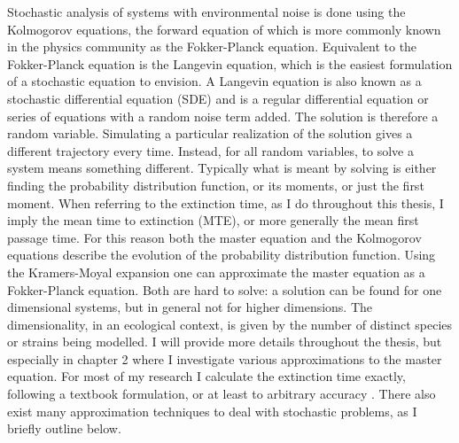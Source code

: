 \iffalse
Stochastic analysis of systems with environmental noise is done using the Kolmogorov equations, the forward equation of which is more commonly known in the physics community as the Fokker-Planck equation. 
Equivalent to the Fokker-Planck equation is the Langevin equation, which is the easiest formulation of a stochastic equation to envision. 
A Langevin equation is also known as a stochastic differential equation (SDE) and is a regular differential equation or series of equations with a random noise term added. 
The solution is therefore a random variable. 
Simulating a particular realization of the solution gives a different trajectory every time. 
Instead, for all random variables, to solve a system means something different. 
Typically what is meant by solving is either finding the probability distribution function, or its moments, or just the first moment. 
When referring to the extinction time, as I do throughout this thesis, I imply the mean time to extinction (MTE), or more generally the mean first passage time. 
For this reason both the master equation and the Kolmogorov equations describe the evolution of the probability distribution function. 
Using the Kramers-Moyal expansion one can approximate the master equation as a Fokker-Planck equation. 
Both are hard to solve: a solution can be found for one dimensional systems, but in general not for higher dimensions. 
The dimensionality, in an ecological context, is given by the number of distinct species or strains being modelled. 
I will provide more details throughout the thesis, but especially in chapter 2 where I investigate various approximations to the master equation. 
For most of my research I calculate the extinction time exactly, following a textbook formulation, or at least to arbitrary accuracy \cite{Nisbet1982,Norden1982}. 
There also exist many approximation techniques to deal with stochastic problems, as I briefly outline below. %

